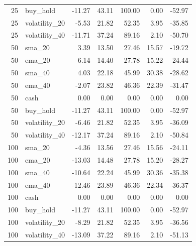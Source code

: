 \begin{longtable}{rlrrrrr}
25 & buy\_hold & -11.27 & 43.11 & 100.00 & 0.00 & -52.97 \\
25 & volatility\_20 & -5.53 & 21.82 & 52.35 & 3.95 & -35.85 \\
25 & volatility\_40 & -11.71 & 37.24 & 89.16 & 2.10 & -50.70 \\
50 & sma\_20 & 3.39 & 13.50 & 27.46 & 15.57 & -19.72 \\
50 & ema\_20 & -6.14 & 14.40 & 27.78 & 15.22 & -24.44 \\
50 & sma\_40 & 4.03 & 22.18 & 45.99 & 30.38 & -28.62 \\
50 & ema\_40 & -2.07 & 23.82 & 46.36 & 22.39 & -31.47 \\
50 & cash & 0.00 & 0.00 & 0.00 & 0.00 & 0.00 \\
50 & buy\_hold & -11.27 & 43.11 & 100.00 & 0.00 & -52.97 \\
50 & volatility\_20 & -6.46 & 21.82 & 52.35 & 3.95 & -36.09 \\
50 & volatility\_40 & -12.17 & 37.24 & 89.16 & 2.10 & -50.84 \\
100 & sma\_20 & -4.36 & 13.56 & 27.46 & 15.56 & -24.11 \\
100 & ema\_20 & -13.03 & 14.48 & 27.78 & 15.20 & -28.27 \\
100 & sma\_40 & -10.64 & 22.24 & 45.99 & 30.36 & -35.38 \\
100 & ema\_40 & -12.46 & 23.89 & 46.36 & 22.34 & -36.37 \\
100 & cash & 0.00 & 0.00 & 0.00 & 0.00 & 0.00 \\
100 & buy\_hold & -11.27 & 43.11 & 100.00 & 0.00 & -52.97 \\
100 & volatility\_20 & -8.29 & 21.82 & 52.35 & 3.95 & -36.56 \\
100 & volatility\_40 & -13.09 & 37.22 & 89.16 & 2.10 & -51.13 \\
\bottomrule\end{longtable}
